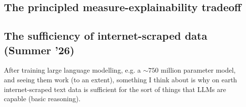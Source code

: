 \documentclass[11pt]{article}
\begin{document}
\begin{appendices}
\subsection{The principled measure-explainability tradeoff}

\subsection{The sufficiency of internet-scraped data (Summer '26)}
After training large language modelling, e.g. a $\sim750$ million parameter model, and seeing them work (to an extent), something I think about is why on earth internet-scraped text data is sufficient for the sort of things that LLMs are capable (basic reasoning).

\end{appendices}
\end{document}
